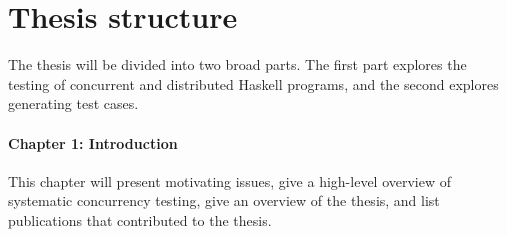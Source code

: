 \documentclass{article}
\begin{document}
\section{Thesis structure}
\label{sec:outline}

The thesis will be divided into two broad parts. The first part
explores the testing of concurrent and distributed Haskell programs,
and the second explores generating test cases.

\paragraph{Chapter 1: Introduction} This chapter will present
motivating issues, give a high-level overview of systematic
concurrency testing, give an overview of the thesis, and list
publications that contributed to the thesis.
\end{document}
